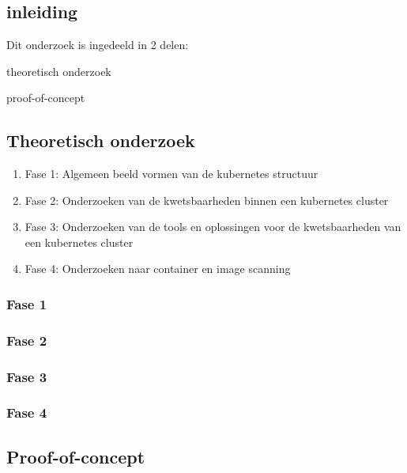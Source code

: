 
\chapter{}%
\label{ch:methodologie}

\section{inleiding}

Dit onderzoek is ingedeeld in 2 delen:
\item theoretisch onderzoek
\item proof-of-concept

\section{Theoretisch onderzoek}

\begin{enumerate}
    \item Fase 1: Algemeen beeld vormen van de kubernetes structuur
    \item Fase 2: Onderzoeken van de kwetsbaarheden binnen een kubernetes cluster
    \item Fase 3: Onderzoeken van de tools en oplossingen voor de kwetsbaarheden van een kubernetes cluster
    \item Fase 4: Onderzoeken naar container en image scanning
\end{enumerate}

\subsection{Fase 1}


\subsection{Fase 2}


\subsection{Fase 3}


\subsection{Fase 4}



\section{Proof-of-concept}

